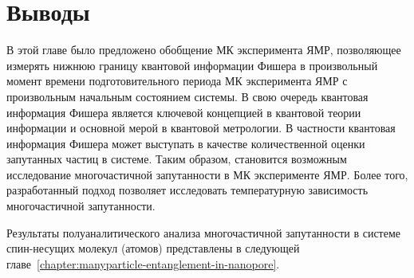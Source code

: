 \section{Выводы}
В этой главе было предложено обобщение МК эксперимента ЯМР,
позволяющее измерять нижнюю границу квантовой информации Фишера
в произвольный момент времени подготовительного периода МК эксперимента ЯМР
с произвольным начальным состоянием системы.
В свою очередь квантовая информация Фишера является ключевой концепцией в квантовой теории информации
и основной мерой в квантовой метрологии.
В частности квантовая информация Фишера может выступать в качестве количественной оценки запутанных частиц в системе.
Таким образом, становится возможным исследование многочастичной запутанности в МК эксперименте ЯМР.
Более того, разработанный подход позволяет исследовать температурную зависимость многочастичной запутанности.

Результаты полуаналитического анализа многочастичной запутанности в системе спин-несущих молекул (атомов) представлены в следующей главе~\ref{chapter:manyparticle-entanglement-in-nanopore}.